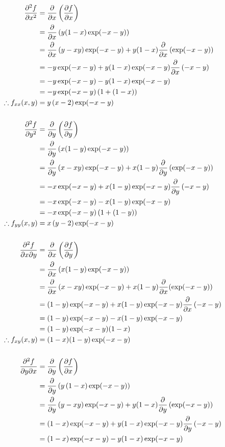 \documentclass[a4paper, 11pt]{report}
\begin{document}
\begin{gather*}
	\begin{aligned}
		\del{^2 f}{x^2} &= \del{}{x}\bracks{\del{f}{x}} \\
			&= \del{}{x}\bracks{y (1 - x) \exp(-x - y)} \\
			&= \del{}{x}\bracks{y-xy}\exp(-x-y) + y(1-x)\del{}{x}\bracks{\exp(-x-y)} \\
			&= -y\exp(-x-y) + y(1-x)\exp(-x-y)\del{}{x}\bracks{-x-y} \\
			&= -y\exp(-x-y) - y(1-x)\exp(-x-y) \\
			&= -y\exp(-x-y)\bracks{1 + (1-x)} \\
		\tf f_{xx}(x,y) &= y\bracks{x-2}\exp(-x-y) \\ {}^{}\\
		\del{^2 f}{y^2} &= \del{}{y}\bracks{\del{f}{y}} \\
			&= \del{}{y}\bracks{x(1-y)\exp(-x-y)} \\
			&= \del{}{y}\bracks{x-xy}\exp(-x-y) + x(1-y)\del{}{y}\bracks{\exp(-x-y)} \\
			&= -x\exp(-x-y) + x(1-y)\exp(-x-y) \del{}{y}\bracks{-x-y} \\
			&= -x\exp(-x-y) - x(1-y)\exp(-x-y) \\
			&= -x\exp(-x-y) \bracks{1 + (1-y)} \\
		\tf f_{yy}(x,y) &= x\bracks{y-2}\exp(-x-y) \\ {}^{}\\
		\del{^2 f}{x\partial y} &= \del{}{x}\bracks{\del{f}{y}} \\
			&= \del{}{x}\bracks{x(1-y)\exp(-x-y)} \\
			&= \del{}{x}\bracks{x-xy}\exp(-x-y) + x(1-y)\del{}{x}(\exp(-x-y)) \\
			&= (1-y)\exp(-x-y) + x(1-y)\exp(-x-y)\del{}{x}\bracks{-x-y} \\
			&= (1-y)\exp(-x-y) - x(1-y)\exp(-x-y) \\
			&= (1-y)\exp(-x-y) (1 - x) \\
		\tf f_{xy}(x,y) &= (1-x)(1-y)\exp(-x-y) \\ {}^{}\\
		\del{^2 f}{y\partial x} &= \del{}{y}\bracks{\del{f}{x}} \\
			&= \del{}{y}\bracks{y\bracks{1 - x}\exp(-x-y)} \\
			&= \del{}{y}\bracks{y-xy}\exp(-x-y) + y(1-x)\del{}{y}\bracks{\exp(-x-y)} \\
			&= \bracks{1-x}\exp(-x-y) + y(1-x)\exp(-x-y)\del{}{y}\bracks{-x-y} \\
			&= \bracks{1-x}\exp(-x-y) - y(1-x)\exp(-x-y) \\

\end{aligned}
\end{gather*}
\end{document}
